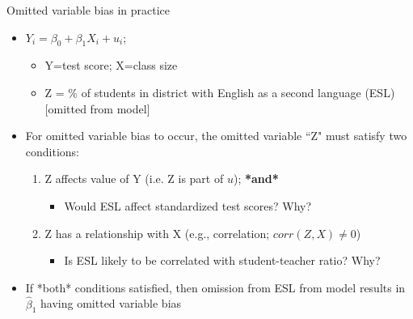 \begin{frame}{Omitted variable bias in practice}
	\begin{itemize}
	\item $Y_{i} = \beta_{0} + \beta_{1}X_{i} + u_{i}$; 
		\begin{itemize}
		\item Y=test score; X=class size
		\item Z = \% of students in district with English as a second language (ESL) [omitted from model]
		\end{itemize}
	\item For omitted variable bias to occur, the omitted variable ``Z" must satisfy two conditions:
		\begin{enumerate}
		\item Z affects value of Y (i.e. Z is part of $u$); \textbf{*and*}
			\begin{itemize}
			\item Would ESL affect standardized test scores? Why?
			\end{itemize}
		\item Z has a relationship with X (e.g., correlation; $corr(Z,X) \neq 0$)
			\begin{itemize}
			\item Is ESL likely to be correlated with student-teacher ratio? Why?
			\end{itemize}		
		\end{enumerate}
	\item If *both* conditions satisfied, then omission from ESL from model results in $\hat{\beta}_{1}$ having omitted variable bias
	\end{itemize}
\end{frame}


